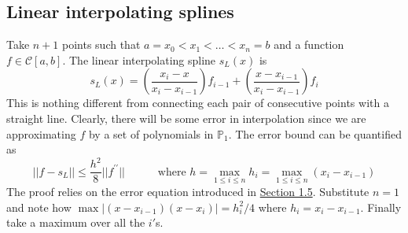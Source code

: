 \documentclass[11pt]{article}
\theoremstyle{definition}
\newcommand{\PP}{\mathbb{P}}
\newcommand{\C}{\mathcal{C}}
\begin{document}
\subsection{Linear interpolating splines}
Take $n+1$ points such that $a=x_0<x_1<\dots<x_n=b$ and a function $f\in\C[a,b]$. The linear interpolating spline $s_L(x)$ is $$\boxed{s_L(x)=\left(\frac{x_i-x}{x_i-x_{i-1}}\right)f_{i-1}+\left(\frac{x-x_{i-1}}{x_i-x_{i-1}}\right)f_i}$$
This is nothing different from connecting each pair of consecutive points with a straight line. Clearly, there will be some error in interpolation since we are approximating $f$ by a set of polynomials in $\PP_1$. The error bound can be quantified as
$$||f-s_L||\leqslant \frac{h^2}{8}||f^{\prime\prime}||\text{ }\text{ }\text{ }\text{ }\text{ where }h=\max_{1\leqslant i\leqslant n}h_i=\max_{1\leqslant i\leqslant n}(x_i-x_{i-1})$$
The proof relies on the error equation introduced in \hyperref[subsec:error_eq]{Section 1.5}. Substitute $n=1$ and note how $\max|(x-x_{i-1})(x-x_i)|=h_i^2/4$ where $h_i=x_i-x_{i-1}$. Finally take a maximum over all the $i'$s.
\newpage
\end{document}

